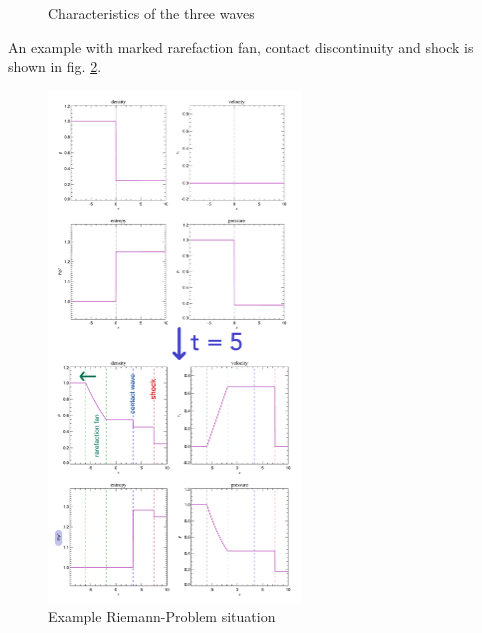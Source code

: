 \begin{figure}[htb!]
    \centering
    
    \caption{Characteristics of the three waves}
    \label{fig:riemann_problem_characteristics}
\end{figure}

An example with marked rarefaction fan, contact discontinuity and shock is shown in fig. \ref{fig:riemann_problem_example}.

\begin{figure}[htb!]
    \centering
    \includegraphics[width=0.6\textwidth]{figures/riemann_problem_example.pdf}
    \caption{Example Riemann-Problem situation}
    \label{fig:riemann_problem_example}
\end{figure}

